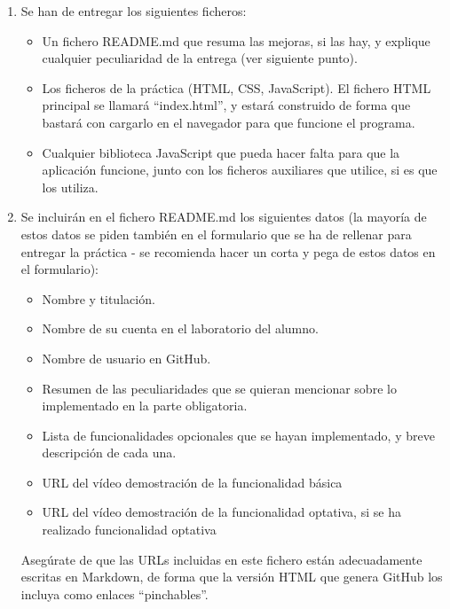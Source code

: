 \begin{enumerate}
  \item Se han de entregar los siguientes ficheros:

\begin{itemize}
  \item Un fichero README.md que resuma las mejoras, si las hay, y explique cualquier peculiaridad de la entrega (ver siguiente punto).
  \item Los ficheros de la práctica (HTML, CSS, JavaScript). El fichero HTML principal se llamará ``index.html'', y estará construido de forma que bastará con cargarlo en el navegador para que funcione el programa.
  \item Cualquier biblioteca JavaScript que pueda hacer falta para que la aplicación funcione, junto con los ficheros auxiliares que utilice, si es que los utiliza.
\end{itemize}

  \item Se incluirán en el fichero README.md los siguientes datos (la mayoría de estos datos se piden también en el formulario que se ha de rellenar para entregar la práctica - se recomienda hacer un corta y pega de estos datos en el formulario):

\begin{itemize}
  \item Nombre y titulación.
  \item Nombre de su cuenta en el laboratorio del alumno.
  \item Nombre de usuario en GitHub.
  \item Resumen de las peculiaridades que se quieran mencionar sobre lo implementado en la parte obligatoria.
  \item Lista de funcionalidades opcionales que se hayan implementado, y breve descripción de cada una.
  \item URL del vídeo demostración de la funcionalidad básica
  \item URL del vídeo demostración de la funcionalidad optativa, si se ha realizado funcionalidad optativa
\end{itemize}

Asegúrate de que las URLs incluidas en este fichero están adecuadamente escritas en Markdown, de forma que la versión HTML que genera GitHub los incluya como enlaces ``pinchables''.

\end{enumerate}



